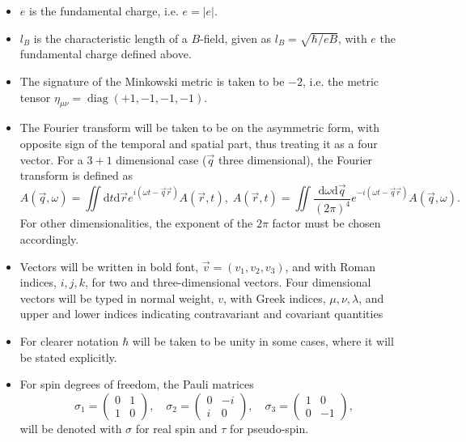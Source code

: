 \begin{itemize}
\item $e$ is the fundamental charge, i.e. $e = |e|$.
\item $l_B$ is the characteristic length of a $B$-field, given as $l_B= \sqrt{\hbar /eB}$, with $e$ the fundamental charge defined above.
\item The signature of the Minkowski metric is taken to be $-2$, i.e. the metric tensor $\eta _{\mu \nu } = \operatorname{diag} (+1, -1,-1,-1)$.
\item The Fourier transform will be taken to be on the asymmetric form, with opposite sign of the temporal and spatial part, thus treating it as a four vector.
  For a $3+1$ dimensional case ($\vec{q}$ three dimensional), the Fourier transform is defined as
  \begin{equation}
    \label{eq:define-fourier}
    A(\vec{q}, \omega ) =\!\!
    \iint \mathrm{d}t \mathrm{d} \vec{r}
    e^{i(\omega  t - \vec{q} \vec{r} )}
    A(\vec{r}, t),
    \;
    A(\vec{r}, t) =\!\!
    \iint 
    \frac{\mathrm{d}\omega  \mathrm{d} \vec{q}}{(2\pi )^4}
    e^{-i(\omega  t - \vec{q} \vec{r} )}
    A(\vec{q}, \omega).
  \end{equation}
  For other dimensionalities, the exponent of the $2\pi $ factor must be chosen accordingly.

\item Vectors will be written in bold font, $\vec{v} = (v_1, v_2, v_3)$, and with Roman indices, $i, j, k$, for two and three-dimensional vectors.
  Four dimensional vectors will be typed in normal weight, $v$, with Greek indices, $\mu ,  \nu , \lambda $, and upper and lower indices indicating contravariant and covariant quantities
\item For clearer notation $\hbar$ will be taken to be unity in some cases, where it will be stated explicitly. 
\item For spin degrees of freedom, the Pauli matrices
  \begin{equation}
    \sigma _1 =
    \begin{pmatrix}
      0 & 1\\ 1 & 0
    \end{pmatrix},
    \quad
    \sigma _2 =
    \begin{pmatrix}
      0 & -i\\ i & 0
    \end{pmatrix},
    \quad
    \sigma _3 =
    \begin{pmatrix}
      1 & 0\\ 0 & -1
    \end{pmatrix},
  \end{equation}
  will be denoted with $\sigma $ for real spin and $\tau $ for pseudo-spin.
  

\end{itemize}
